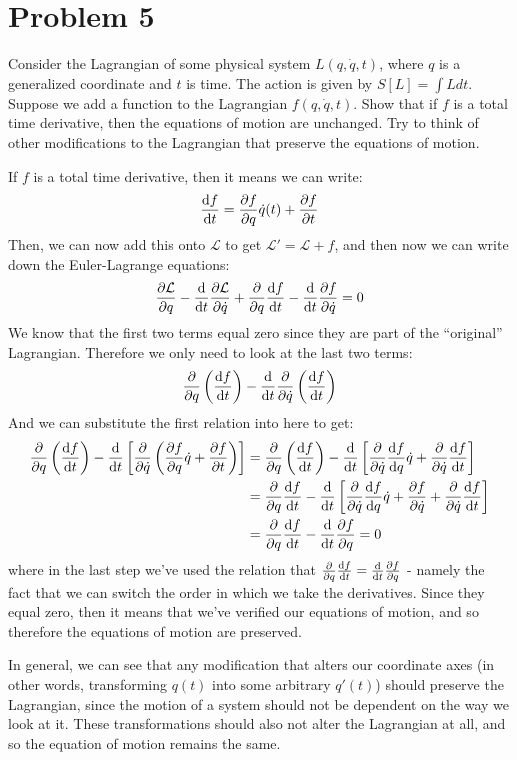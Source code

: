 \documentclass[10pt]{article}
\begin{document}
    \pagebreak

    \section*{Problem 5}

    Consider the Lagrangian of some physical system $L(q, \dot q, t)$, where $q$ is a generalized coordinate and $t$ is time. The action is given by $S[L] = \int L dt$. Suppose we add a function to the Lagrangian $f(q, \dot q, t)$. Show that if $f$ is a total time derivative, then the equations of motion are unchanged. Try to think of other modifications to the Lagrangian that preserve the equations of motion.

    \begin{solution}
        If $f$ is a total time derivative, then it means we can write: 
        \[ \dv{f}{t} = \pdv{f}{q}\dot q(t) + \pdv{f}{t}\] 
        Then, we can now add this onto $\mathcal L$ to get $\mathcal L' = \mathcal L + f$, and then now we can write down the Euler-Lagrange equations: 
        \[ \pdv{\mathcal L}{q} - \dv{t} \pdv{\mathcal L}{\dot q} + \pdv{q}\dv{f}{t} - \dv{t} \pdv{f}{\dot q} = 0\] 
        We know that the first two terms equal zero since they are part of the ``original'' Lagrangian. Therefore we only need to look at the last two terms:
        \[ \pdv{q} \left( \dv{f}{t}\right) - \dv{t}\pdv{\dot q}\left( \dv{f}{t}\right)\]
        And we can substitute the first relation into here to get: 
        \begin{align*}
            \pdv{q}\left(\dv{f}{t}\right) - \dv{t}\left[\pdv{\dot q}\left(\pdv{f}{q}\dot q + \pdv{f}{t}\right)\right] &= \pdv{q} \left( \dv{f}{t}\right) - \dv{t}\left[\pdv{\dot q} \dv{f}{q} \dot q + \pdv{\dot q} \dv{f}{t}\right]\\
            &= \pdv{q}\dv{f}{t} - \dv t\left[ \pdv{\dot q} \dv{f}{q} \dot q + \pdv{f}{\dot q} + \pdv{\dot q} \dv{f}{t}\right]\\
            &= \pdv{q}\dv{f}{t}  - \dv{t} \pdv{f}{q} = 0
        \end{align*}
        where in the last step we've used the relation that $\pdv{q} \dv{f}{t} = \dv{t} \pdv{f}{q}$ - namely the fact that we can switch the order in which we take the derivatives. Since they equal zero, then it means that we've verified our equations of motion, and so therefore the equations of motion are preserved.

        In general, we can see that any modification that alters our coordinate axes (in other words, transforming $q(t)$ into some arbitrary $q'(t)$) should preserve the Lagrangian, since the motion of a system should not be dependent on the way we look at it. These transformations should also not alter the Lagrangian at all, and so the equation of motion remains the same.
    \end{solution}
\end{document}
